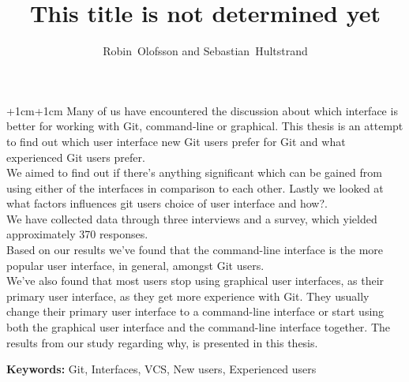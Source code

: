 \documentclass[a4paper,oneside]{bth} %
\begin{document}
		\abstract
		\begin{changemargin}{+1cm}{+1cm}
			\noindent
				Many of us have encountered the discussion about which interface is better for working with Git, command-line or graphical.
				This thesis is an attempt to find out which user interface new Git users prefer for Git and what experienced Git users prefer.\\
				We aimed to find out if there's anything significant which can be gained from using either of the interfaces in comparison to each other. Lastly we looked at what factors influences git users choice of user interface and how?.\\
				We have collected data through three interviews and a survey, which yielded approximately 370 responses.\\
				Based on our results we've found that the command-line interface is the more popular user interface, in general, amongst Git users.
				\\We've also found that most users stop using graphical user interfaces, as their primary user interface, as they get more experience with Git. They usually change their primary user interface to a command-line interface or start using both the graphical user interface and the command-line interface together.
				The results from our study regarding why, is presented in this thesis.
				

			\par\vspace {1cm}
			\noindent
			\textbf{Keywords:} Git, Interfaces, VCS, New users, Experienced users
		\end{changemargin}

		\tableofcontents 
		\listoffigures %
		
		\cleardoublepage
		\pagestyle{headings}
		
		\title{This title is not determined yet}
		\author{Robin~Olofsson and Sebastian~Hultstrand}
		
\end{document}
